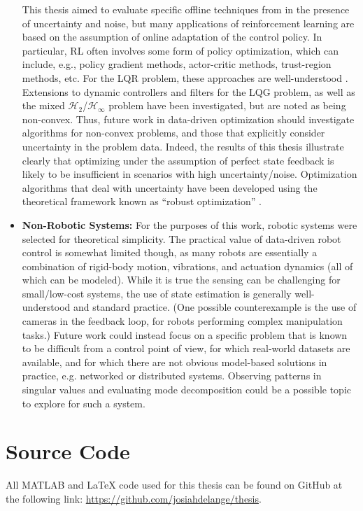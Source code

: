 \begin{itemize}
{This thesis aimed to evaluate specific offline techniques from \cite{de2019formulas} in the presence of uncertainty and noise, but many applications of reinforcement learning are based on the assumption of online adaptation of the control policy.  In particular, RL often involves some form of policy optimization, which can include, e.g., policy gradient methods, actor-critic methods, trust-region methods, etc.  For the LQR problem, these approaches are well-understood \cite{malik2019derivative}.  Extensions to dynamic controllers \cite{zheng2022escaping} and filters \cite{umenberger2022globally} for the LQG problem, as well as the mixed $\mathcal{H}_{2}$/$\mathcal{H}_{\infty}$ problem \cite{zhang2021derivative, zhang2020policy} have been investigated, but are noted as being non-convex.  Thus, future work in data-driven optimization should investigate algorithms for non-convex problems, and those that explicitly consider uncertainty in the problem data.  Indeed, the results of this thesis illustrate clearly that optimizing under the assumption of perfect state feedback is likely to be insufficient in scenarios with high uncertainty/noise.  Optimization algorithms that deal with uncertainty have been developed using the theoretical framework known as ``robust optimization'' \cite{soyster1973convex, ei1997robust, el1998robust, ben1999robust, ben2001lectures, ben2002robust, bertsimas2003robust, bertsimas2004price, joelianto5417249}.
}
%
\item{\textbf{Non-Robotic Systems:}
For the purposes of this work, robotic systems were selected for theoretical simplicity.  The practical value of data-driven robot control is somewhat limited though, as many robots are essentially a combination of rigid-body motion, vibrations, and actuation dynamics (all of which can be modeled).  While it is true the sensing can be challenging for small/low-cost systems, the use of state estimation is generally well-understood and standard practice.  (One possible counterexample is the use of cameras in the feedback loop, for robots performing complex manipulation tasks.)  Future work could instead focus on a specific problem that is known to be difficult from a control point of view, for which real-world datasets are available, and for which there are not obvious model-based solutions in practice, e.g. networked or distributed systems.  Observing patterns in singular values and evaluating mode decomposition could be a possible topic to explore for such a system.
}
\end{itemize}

\section{Source Code}
All MATLAB and LaTeX code used for this thesis can be found on GitHub at the following link: \url{https://github.com/josiahdelange/thesis}.
